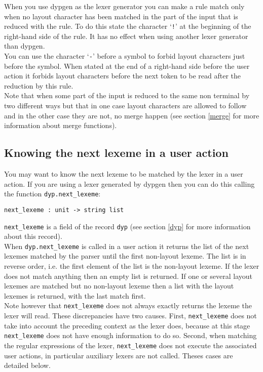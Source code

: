 \documentclass[12pt]{article}
\begin{document}
{When you use dypgen as the lexer generator you can make a rule match only when no layout character has been matched in the part of the input that is reduced with the rule. To do this state the character `\verb|!|' at the beginning of the right-hand side of the rule. It has no effect when using another lexer generator than dypgen.\\

You can use the character `\verb|-|' before a symbol to forbid layout characters just before the symbol. When stated at the end of a right-hand side before the user action it forbids layout characters before the next token to be read after the reduction by this rule.\\

Note that when some part of the input is reduced to the same non terminal by two different ways but that in one case layout characters are allowed to follow and in the other case they are not, no merge happen (see section \ref{merge} for more information about merge functions).

\subsection{Knowing the next lexeme in a user action}\label{next_lexeme}

You may want to know the next lexeme to be matched by the lexer in a user action. If you are using a lexer generated by dypgen then you can do this calling the function \verb|dyp.next_lexeme|:
\begin{verbatim}
next_lexeme : unit -> string list
\end{verbatim}
\verb|next_lexeme| is a field of the record \verb|dyp| (see section \ref{dyp} for more information about this record).\\

When \verb|dyp.next_lexeme| is called in a user action it returns the list of the next lexemes matched by the parser until the first non-layout lexeme.
The list is in reverse order, i.e. the first element of the list is the non-layout lexeme. If the lexer does not match anything then an empty list is returned. If one or several layout lexemes are matched but no non-layout lexeme then a list with the layout lexemes is returned, with the last match first.\\

Note however that \verb|next_lexeme| does not always exactly returns the lexeme the lexer will read. These discrepancies have two causes. First, \verb|next_lexeme| does not take into account the preceding context as the lexer does, because at this stage \verb|next_lexeme| does not have enough information to do so. Second, when matching the regular expressions of the lexer, \verb|next_lexeme| does not execute the associated user actions, in particular auxiliary lexers are not called. Theses cases are detailed below.\\

}
\end{document}
